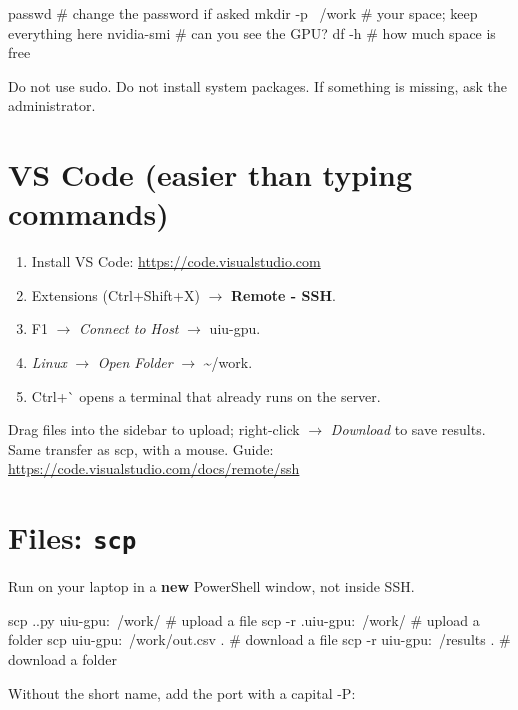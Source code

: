 \documentclass[12pt,a4paper]{article}
\newcommand{\cmd}[1]{{\ttfamily\small #1}}
\begin{document}
\begin{srvblock}
passwd              # change the password if asked
mkdir -p ~/work     # your space; keep everything here
nvidia-smi          # can you see the GPU?
df -h               # how much space is free
\end{srvblock}

Do not use \cmd{sudo}. Do not install system packages. If something is missing, ask the administrator.

\section{VS Code (easier than typing commands)}

\begin{enumerate}[leftmargin=1.3em,itemsep=1pt,topsep=1pt]
  \item Install VS Code: \url{https://code.visualstudio.com}
  \item Extensions (\cmd{Ctrl+Shift+X}) $\rightarrow$ \textbf{Remote - SSH}.
  \item \cmd{F1} $\rightarrow$ \emph{Connect to Host} $\rightarrow$ \cmd{uiu-gpu}.
  \item \emph{Linux} $\rightarrow$ \emph{Open Folder} $\rightarrow$ \cmd{\textasciitilde/work}.
  \item \cmd{Ctrl+\`{}} opens a terminal that already runs on the server.
\end{enumerate}

\begin{tipbox}
Drag files into the sidebar to upload; right-click $\rightarrow$ \emph{Download} to save results.
Same transfer as \cmd{scp}, with a mouse. Guide: \url{https://code.visualstudio.com/docs/remote/ssh}
\end{tipbox}

\section{Files: \texttt{scp}}

Run on your laptop in a \textbf{new} PowerShell window, not inside SSH.

\begin{winblock}
scp .\train.py uiu-gpu:~/work/     # upload a file
scp -r .\project uiu-gpu:~/work/   # upload a folder
scp uiu-gpu:~/work/out.csv .       # download a file
scp -r uiu-gpu:~/results .         # download a folder
\end{winblock}

Without the short name, add the port with a capital \cmd{-P}:
\end{document}

